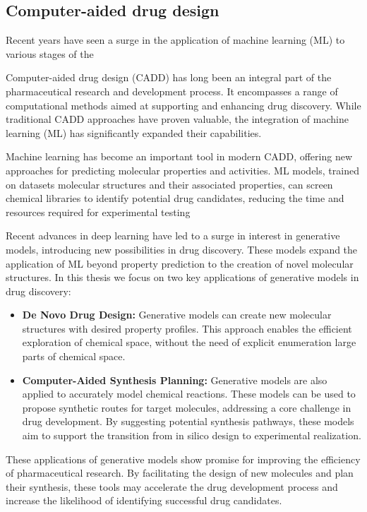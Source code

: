 \subsection{Computer-aided drug design}
Recent years have seen a surge in the application of machine learning (ML) to various stages of the

Computer-aided drug design (CADD) has long been an integral part of the pharmaceutical research and
development process. It encompasses a range of computational methods aimed at supporting and
enhancing drug discovery. While traditional CADD approaches have proven valuable, the integration of
machine learning (ML) has significantly expanded their capabilities.

Machine learning has become an important tool in modern CADD, offering new approaches for predicting
molecular properties and activities. ML models, trained on datasets molecular structures and their
associated properties, can screen chemical libraries to identify potential drug candidates, reducing
the time and resources required for experimental testing

Recent advances in deep learning have led to a surge in interest in generative models, introducing
new possibilities in drug discovery. These models expand the application of ML beyond property
prediction to the creation of novel molecular structures. In this thesis we focus on two key
applications of generative models in drug discovery:
\begin{itemize}
      \item \textbf{De Novo Drug Design:} Generative models can create new molecular structures with desired property
            profiles. This approach enables the efficient exploration of chemical space, without the need of
            explicit enumeration large parts of chemical space.
      \item \textbf{Computer-Aided Synthesis Planning:} Generative models are also applied to accurately model
            chemical reactions. These models can be used to propose synthetic routes
            for target molecules, addressing a core challenge in drug development. By suggesting potential synthesis
            pathways, these models aim to support the transition from in silico design to experimental
            realization.
\end{itemize}

These applications of generative models show promise for improving the efficiency
of pharmaceutical research. By facilitating the design of new molecules and plan their
synthesis, these tools may accelerate the drug development process and increase the likelihood of
identifying successful drug candidates.

